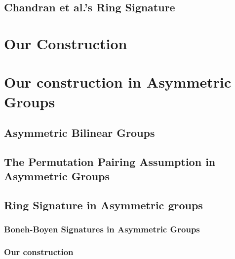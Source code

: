 \documentclass{llncs}
\begin{document}
       \subsection{Chandran et al.'s Ring Signature}
	
         

    \section{Our Construction}

        
    	
        



\appendix

\section{Our construction in Asymmetric Groups}

	

	\subsection{Asymmetric Bilinear Groups}
		

	\subsection{The Permutation Pairing Assumption in Asymmetric Groups} \label{sec:aPPA}
	
		


	\subsection{Ring Signature in Asymmetric groups}

		\subsubsection{Boneh-Boyen Signatures in Asymmetric Groups}

		

		\subsubsection{Our construction}

		
\end{document}
